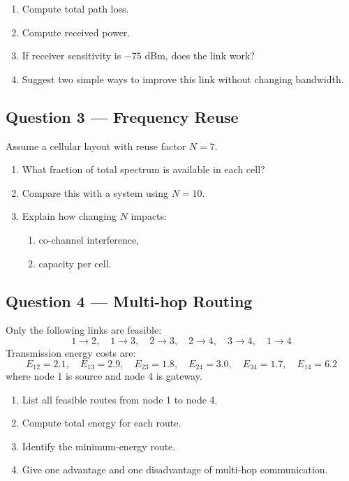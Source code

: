 \documentclass[11pt,a4paper]{article}
\begin{document}
\begin{enumerate}[label=\alph*)]
    \item Compute total path loss.
    \item Compute received power.
    \item If receiver sensitivity is $-75$ dBm, does the link work?
    \item Suggest two simple ways to improve this link without changing bandwidth.
\end{enumerate}

\subsection*{Question 3 --- Frequency Reuse}
Assume a cellular layout with reuse factor $N=7$.

\begin{enumerate}[label=\alph*)]
    \item What fraction of total spectrum is available in each cell?
    \item Compare this with a system using $N=10$.
    \item Explain how changing $N$ impacts:
    \begin{enumerate}[label=\roman*)]
        \item co-channel interference,
        \item capacity per cell.
    \end{enumerate}
\end{enumerate}

\subsection*{Question 4 --- Multi-hop Routing}
Only the following links are feasible:
\[
1 \rightarrow 2,\quad 1 \rightarrow 3,\quad 2 \rightarrow 3,\quad 2 \rightarrow 4,\quad 3 \rightarrow 4,\quad 1 \rightarrow 4
\]
Transmission energy costs are:
\[
E_{12}=2.1,\quad E_{13}=2.9,\quad E_{23}=1.8,\quad E_{24}=3.0,\quad E_{34}=1.7,\quad E_{14}=6.2
\]
where node 1 is source and node 4 is gateway.

\begin{enumerate}[label=\alph*)]
    \item List all feasible routes from node 1 to node 4.
    \item Compute total energy for each route.
    \item Identify the minimum-energy route.
    \item Give one advantage and one disadvantage of multi-hop communication.
\end{enumerate}
\end{document}
